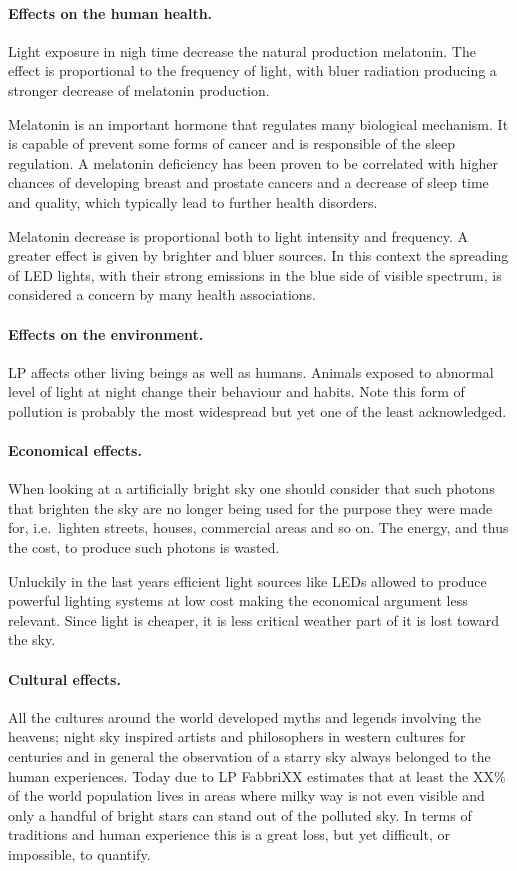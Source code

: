 \documentclass{book}
\begin{document}
\paragraph{Effects on the human health.} Light exposure in nigh time decrease the natural production melatonin. The effect is proportional to the frequency of light, with bluer radiation producing a stronger decrease of melatonin production.
	
Melatonin is an important hormone that regulates many biological mechanism. It is capable of prevent some forms of cancer and is responsible of the sleep regulation. A melatonin deficiency has been proven to be correlated with higher chances of developing breast and prostate cancers and a decrease of sleep time and quality, which typically lead to further health disorders.
	
Melatonin decrease is proportional both to light intensity and frequency. A greater effect is given by brighter and bluer sources. In this context the spreading of LED lights, with their strong emissions in the blue side of visible spectrum, is considered a concern by many health associations.

\paragraph{Effects on the environment.} LP affects other living beings as well as humans. Animals exposed to abnormal level of light at night change their behaviour and habits. Note this form of pollution is probably the most widespread but yet one of the least acknowledged.

\paragraph{Economical effects.} When looking at a artificially bright sky one should consider that such photons that brighten the sky are no longer being used for the purpose they were made for, i.e.\ lighten streets, houses, commercial areas and so on. The energy, and thus the cost, to produce such photons is wasted. 

Unluckily in the last years efficient light sources like LEDs allowed to produce powerful lighting systems at low cost making the economical argument less relevant. Since light is cheaper, it is less critical weather part of it is lost toward the sky.

\paragraph{Cultural effects.} All the cultures around the world developed myths and legends involving the heavens; night sky inspired artists and philosophers in western cultures for centuries and in general the observation of a starry sky always belonged to the human experiences. Today due to LP FabbriXX estimates that at least the XX\% of the world population lives in areas where milky way is not even visible and only a handful of bright stars can stand out of the polluted sky. In terms of traditions and human experience this is a great loss, but yet difficult, or impossible, to quantify.
\end{document}
